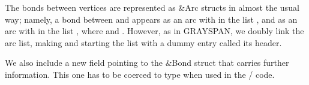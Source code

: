 The bonds between vertices are represented as \&{Arc} structs in
almost the usual way; namely, a bond between  and  appears as
an arc  with  in the list , and as an arc 
with  in the list , where  and .
However, as in {\mc GRAYSPAN}, we doubly link the arc list,
making  and
starting the list with
a dummy entry called its header.

We also include a new field
 pointing to the \&{Bond} struct that carries further
information.
This one has to be coerced to type  when used in the %
\CEE/ code.

